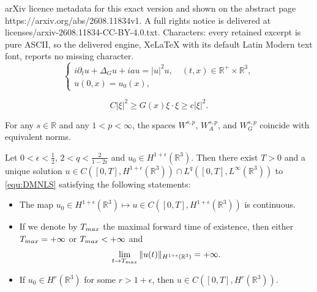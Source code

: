 \documentclass[10pt,a4paper]{amsart}
\newcommand{\R}{\mathbb{R}}
\begin{document}
arXiv licence metadata for this exact version and shown on the abstract page https://arxiv.org/abs/2608.11834v1. A full rights notice is delivered at licenses/arxiv-2608.11834-CC-BY-4.0.txt. Characters: every retained excerpt is pure ASCII, so the delivered engine, XeLaTeX with its default Latin Modern text font, reports no missing character.
	\begin{equation}\label{equ:DMNLS}
		\begin{cases}
			i\partial_tu+\Delta_{G}u+iau=|u|^{2}u,\quad (t,x)\in\R^+\times\R^3,\\
			u(0,x)=u_0(x),
		\end{cases}
	\end{equation}

	\begin{equation}\label{equ:Gpd}
		C|\xi|^2\geq G(x)\xi\cdot\xi\geq c|\xi|^2. 
	\end{equation}

\begin{lemma}
	\label{lemma_2_2}
	For any $s\in \R$ and any $1<p<\infty$, the spaces $W^{s,p}$, $W_A^{s,p}$, and $W_G^{s,p}$ coincide with equivalent norms.
\end{lemma}

\begin{proposition}\label{prop:LWP}
	Let $0<\epsilon<\frac12$, $2< q<\frac2{1-2\epsilon}$ and $u_0\in H^{1+\epsilon}(\R^3)$. Then there exist $T>0$ and a unique solution $u\in C([0,T], H^{1+\epsilon}(\R^3))\cap L^q([0,T], L^\infty(\R^3))$ to \eqref{equ:DMNLS} satisfying the following statements: 
	\begin{itemize}
		\item The map $u_0\in H^{1+\epsilon}(\R^3)\mapsto u\in C([0,T], H^{1+\epsilon}(\R^3))$ is continuous. 
		\item If we denote by $T_{\rm max}$ the maximal forward time of existence, then  either  $T_{\rm max}=+\infty$ or $T_{\rm max}<+\infty$ and
		\begin{equation*}%
			\lim_{t\to T_{\rm max}}\|u(t)\|_{H^{1+\epsilon}(\R^3)}=+\infty.
		\end{equation*}
		\item If $u_0\in H^r(\R^3)$ for some $r>1+\epsilon$, then $u\in C([0,T],H^r(\R^3))$. 
	\end{itemize}
\end{proposition}
\end{document}
